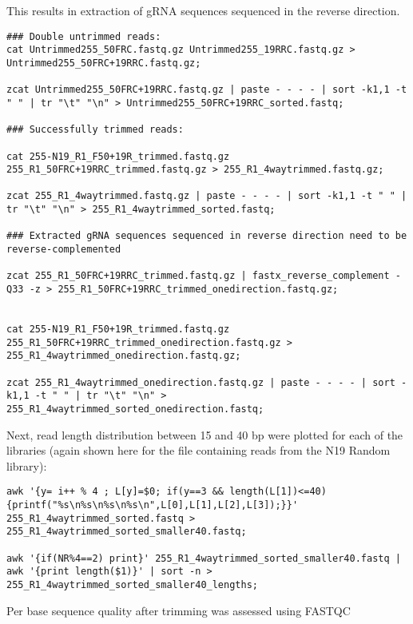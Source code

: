 This results in extraction of gRNA sequences sequenced in the reverse direction.

\begin{small}\begin{lstlisting}
### Double untrimmed reads:
cat Untrimmed255_50FRC.fastq.gz Untrimmed255_19RRC.fastq.gz > Untrimmed255_50FRC+19RRC.fastq.gz;

zcat Untrimmed255_50FRC+19RRC.fastq.gz | paste - - - - | sort -k1,1 -t " " | tr "\t" "\n" > Untrimmed255_50FRC+19RRC_sorted.fastq;

### Successfully trimmed reads:

cat 255-N19_R1_F50+19R_trimmed.fastq.gz 255_R1_50FRC+19RRC_trimmed.fastq.gz > 255_R1_4waytrimmed.fastq.gz;

zcat 255_R1_4waytrimmed.fastq.gz | paste - - - - | sort -k1,1 -t " " | tr "\t" "\n" > 255_R1_4waytrimmed_sorted.fastq;

### Extracted gRNA sequences sequenced in reverse direction need to be reverse-complemented

zcat 255_R1_50FRC+19RRC_trimmed.fastq.gz | fastx_reverse_complement -Q33 -z > 255_R1_50FRC+19RRC_trimmed_onedirection.fastq.gz;


cat 255-N19_R1_F50+19R_trimmed.fastq.gz 255_R1_50FRC+19RRC_trimmed_onedirection.fastq.gz > 255_R1_4waytrimmed_onedirection.fastq.gz;

zcat 255_R1_4waytrimmed_onedirection.fastq.gz | paste - - - - | sort -k1,1 -t " " | tr "\t" "\n" > 255_R1_4waytrimmed_sorted_onedirection.fastq;
\end{lstlisting}\end{small}


Next, read length distribution between 15 and 40 bp were plotted for each of the libraries (again shown here for the file containing reads from the N19 Random library):

\begin{small}\begin{lstlisting}
awk '{y= i++ % 4 ; L[y]=$0; if(y==3 && length(L[1])<=40) {printf("%s\n%s\n%s\n%s\n",L[0],L[1],L[2],L[3]);}}' 255_R1_4waytrimmed_sorted.fastq > 255_R1_4waytrimmed_sorted_smaller40.fastq;

awk '{if(NR%4==2) print}' 255_R1_4waytrimmed_sorted_smaller40.fastq | awk '{print length($1)}' | sort -n >  255_R1_4waytrimmed_sorted_smaller40_lengths;
\end{lstlisting}\end{small}


Per base sequence quality after trimming was assessed using FASTQC \cite{FASTQC:Online}

